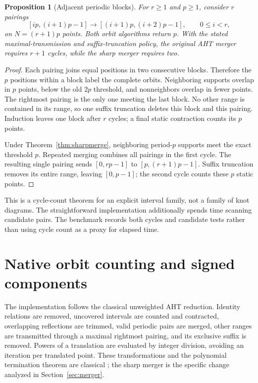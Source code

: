 \documentclass[11pt]{article}
\newtheorem{proposition}[theorem]{Proposition}
\theoremstyle{definition}
\begin{document}
\begin{proposition}[Adjacent periodic blocks]
\label{prop:chain}
For $r\ge1$ and $p\ge1$, consider $r$ pairings
\[
 [ip,(i+1)p-1]\longrightarrow[(i+1)p,(i+2)p-1],
 \qquad 0\le i<r,
\]
on $N=(r+1)p$ points. Both orbit algorithms return $p$. With the stated
maximal-transmission and suffix-truncation policy, the original AHT merger
requires $r+1$ cycles, while the sharp merger requires two.
\end{proposition}

\begin{proof}
Each pairing joins equal positions in two consecutive blocks. Therefore
the $p$ positions within a block label the complete orbits. Neighboring
supports overlap in $p$ points, below the old $2p$ threshold, and
nonneighbors overlap in fewer points. The rightmost pairing is the only
one meeting the last block. No other range is contained in its range,
so one suffix truncation deletes this block and this pairing. Induction
leaves one block after $r$ cycles; a final static contraction counts its
$p$ points.

Under Theorem~\ref{thm:sharpmerge}, neighboring period-$p$ supports meet
the exact threshold $p$. Repeated merging combines all pairings in the
first cycle. The resulting single pairing sends $[0,rp-1]$ to
$[p,(r+1)p-1]$. Suffix truncation removes its entire range, leaving
$[0,p-1]$; the second cycle counts these $p$ static points.
\end{proof}

This is a cycle-count theorem for an explicit interval family, not a
family of knot diagrams. The straightforward implementation additionally
spends time scanning candidate pairs. The benchmark records both cycles
and candidate tests rather than using cycle count as a proxy for elapsed
time.

\section{Native orbit counting and signed components}

The implementation  follows the
classical unweighted AHT reduction. Identity relations are removed,
uncovered intervals are counted and contracted, overlapping reflections
are trimmed, valid periodic pairs are merged, other ranges are transmitted
through a maximal rightmost pairing, and its exclusive suffix is removed.
Powers of a translation are evaluated by integer division, avoiding an
iteration per translated point. These transformations and the polynomial
termination theorem are classical \cite{aht}; the sharp merger is the
specific change analyzed in Section~\ref{sec:merger}.
\end{document}
